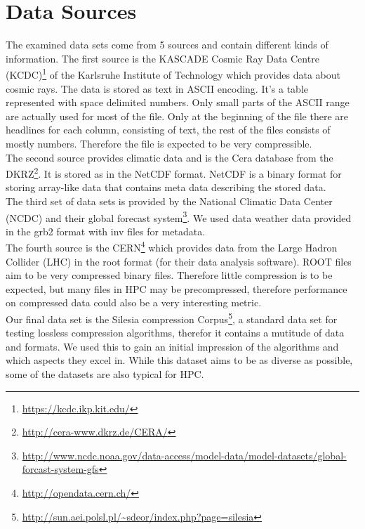 \documentclass[
	12pt,
	a4paper,
	BCOR10mm,
	DIV14,
	listof=totoc,
	bibliography=totoc,
	headsepline
]{scrreprt}
\begin{document}
\section{Data Sources}
The examined data sets come from 5 sources and contain different kinds of information.
The first source is the KASCADE Cosmic Ray Data Centre (KCDC)\footnote{\url{https://kcdc.ikp.kit.edu/}} of the Karlsruhe Institute of Technology which provides data about cosmic rays. 
The data is stored as text in ASCII encoding. 
It's a table represented with space delimited numbers. Only small parts of the ASCII range are actually used for most of the file. Only at the beginning of the file there are headlines for each column, consisting of text, the rest of the files consists of mostly numbers.
Therefore the file is expected to be very compressible.
\\

The second source provides climatic data and is the Cera database from the DKRZ\footnote{\url{http://cera-www.dkrz.de/CERA/}}. 
It is stored as in the NetCDF format.
NetCDF is a binary format for storing array-like data that contains meta data describing the stored data.
\cite{NetCDF}
\\

The third set of data sets is provided by the National Climatic Data Center (NCDC) and their global forecast system\footnote{\url{http://www.ncdc.noaa.gov/data-access/model-data/model-datasets/global-forcast-system-gfs}}. 
We used data weather data provided in the grb2 format with inv files for metadata. 
\\

The fourth source is the CERN\footnote{\url{http://opendata.cern.ch/}} which provides data from the Large Hadron Collider (LHC) in the root format (for their data analysis software).
ROOT files aim to be very compressed binary files. Therefore little compression is to be expected, but many files in HPC may be precompressed, therefore performance on compressed data could also be a very interesting metric.
\\

Our final data set is the Silesia compression Corpus\footnote{\url{http://sun.aei.polsl.pl/~sdeor/index.php?page=silesia}}, a standard data set for testing lossless compression algorithms, therefor it contains a mutitude of data and formats. We used this to gain an initial impression of the algorithms and which aspects they excel in. While this dataset aims to be as diverse as possible, some of the datasets are also typical for HPC.
\\
\end{document}
